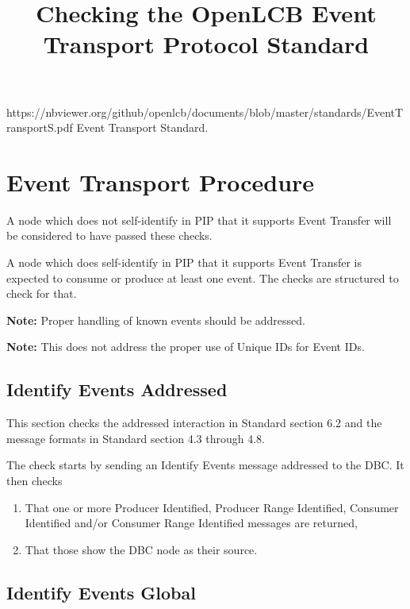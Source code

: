 

\title{Checking the OpenLCB Event Transport Protocol Standard}


\maketitle

\introductionCaveats
    {https://nbviewer.org/github/openlcb/documents/blob/master/standards/EventTransportS.pdf}
    {Event Transport Standard}.

\section{Event Transport Procedure}


A node which does not self-identify in PIP that it supports
Event Transfer will be considered to have passed these checks.
\pipsetFootnote

A node which does self-identify in PIP that it supports 
Event Transfer is expected to consume or produce at least 
one event.  The checks are structured to check for that.

\textbf{Note:}  Proper handling of known events should be addressed.

\textbf{Note:}  This does not address the proper use of Unique IDs for Event IDs.

\subsection{Identify Events Addressed}

This section checks the addressed interaction in Standard section 6.2 and
the message formats in Standard section 4.3 through 4.8.

The check starts by sending an Identify Events message addressed to the DBC.
It then checks

\begin{enumerate}
\item That one or more Producer Identified, Producer Range Identified, 
        Consumer Identified and/or Consumer Range Identified messages are returned,
\item That those show the DBC node as their source.
\end{enumerate}

\subsection{Identify Events Global}

